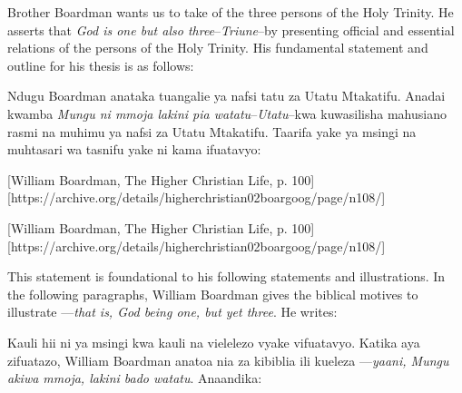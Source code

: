 Brother Boardman wants us to take  of the three persons of the Holy Trinity. He asserts that \textit{God is one but also three}–\textit{Triune}–by presenting official and essential relations of the persons of the Holy Trinity. His fundamental statement and outline for his thesis is as follows:


Ndugu Boardman anataka tuangalie  ya nafsi tatu za Utatu Mtakatifu. Anadai kwamba \textit{Mungu ni mmoja lakini pia watatu}–\textit{Utatu}–kwa kuwasilisha mahusiano rasmi na muhimu ya nafsi za Utatu Mtakatifu. Taarifa yake ya msingi na muhtasari wa tasnifu yake ni kama ifuatavyo:


[William Boardman, The Higher Christian Life, p. 100][https://archive.org/details/higherchristian02boargoog/page/n108/]


[William Boardman, The Higher Christian Life, p. 100][https://archive.org/details/higherchristian02boargoog/page/n108/]


This statement is foundational to his following statements and illustrations. In the following paragraphs, William Boardman gives the biblical motives to illustrate —\textit{that is, God being one, but yet three}. He writes:


Kauli hii ni ya msingi kwa kauli na vielelezo vyake vifuatavyo. Katika aya zifuatazo, William Boardman anatoa nia za kibiblia ili kueleza —\textit{yaani, Mungu akiwa mmoja, lakini bado watatu}. Anaandika:


